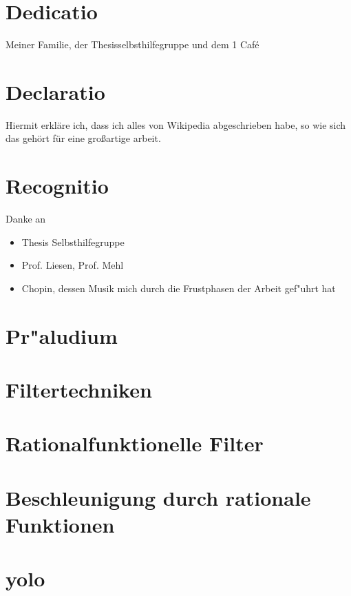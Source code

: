 \documentclass[12pt, twoside]{report} %
\begin{document}


\chapter*{Dedicatio}
Meiner Familie, der Thesisselbsthilfegruppe und dem 1 Café

\chapter*{Declaratio}
Hiermit erkläre ich, dass ich alles von Wikipedia abgeschrieben habe, so
wie sich das gehört für eine großartige arbeit.

\chapter*{Recognitio}
Danke an
\begin{itemize}
\item Thesis Selbsthilfegruppe
\item Prof. Liesen, Prof. Mehl
\item Chopin, dessen Musik mich durch die Frustphasen der Arbeit gef"uhrt hat
\end{itemize}

\tableofcontents

\chapter{Pr"aludium}%


\chapter{Filtertechniken} %


\chapter{Rationalfunktionelle Filter}
\chapter{Beschleunigung durch rationale Funktionen}%


%

%

\appendix
\chapter{yolo}


\nocite{*}
\printbibliography
\end{document}
